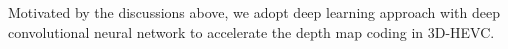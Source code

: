 Motivated by the discussions above, we adopt deep learning approach with
deep convolutional neural network to accelerate the depth map coding in
3D-HEVC\@.



%
%
%
%
%
